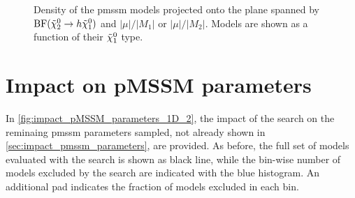 \begin{figure}[h]
\begin{subfigure}[b]{0.49\linewidth}
		\caption{\label{fig:lsp_types_BR_Higgs_muM2}}
	\end{subfigure}\hfill
	\caption{Density of the \gls{pmssm} models projected onto the plane spanned by $\mathrm{BF}(\tilde{\chi}_2^0 \rightarrow h \tilde{\chi}_1^0)$ and  $\vert\mu\vert/\vert M_1 \vert$ or  $\vert\mu\vert/\vert M_2 \vert$. Models are shown as a function of their $\tilde{\chi}_1^0$ type.}
	\label{fig:higgs_coupling_neutralino}
\end{figure}

\FloatBarrier

\section{Impact on pMSSM parameters}

In \cref{fig:impact_pMSSM_parameters_1D_2}, the impact of the \onelepton search on the reminaing \gls{pmssm} parameters sampled, not already shown in \cref{sec:impact_pmssm_parameters}, are provided. As before, the full set of models evaluated with the \onelepton search is shown as black line, while the bin-wise number of models excluded by the search are indicated with the blue histogram. An additional pad indicates the fraction of models excluded in each bin.

